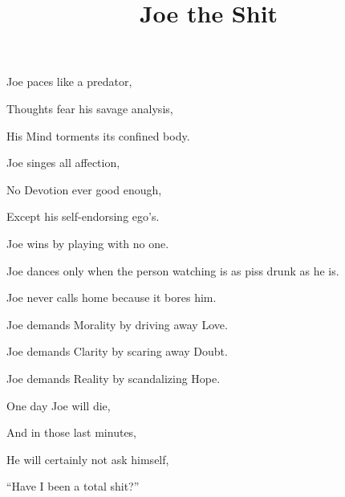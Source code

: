 \documentclass{article}
\title{Joe the Shit}
\begin{document}
 \newline

Joe paces like a predator,

Thoughts fear his savage analysis,

His Mind torments its confined body.

\newline 

Joe singes all affection,

No Devotion ever good enough,

Except his self-endorsing ego's.

\newline

Joe wins by playing with no one.

Joe dances only when the person watching is as piss drunk as he is.

Joe never calls home because it bores him.

\newline

Joe demands Morality by driving away Love.

Joe demands Clarity by scaring away Doubt.

Joe demands Reality by scandalizing Hope.

\newline

One day Joe will die,

And in those last minutes,

He will certainly not ask himself,

``Have I been a total shit?''
\end{document}
